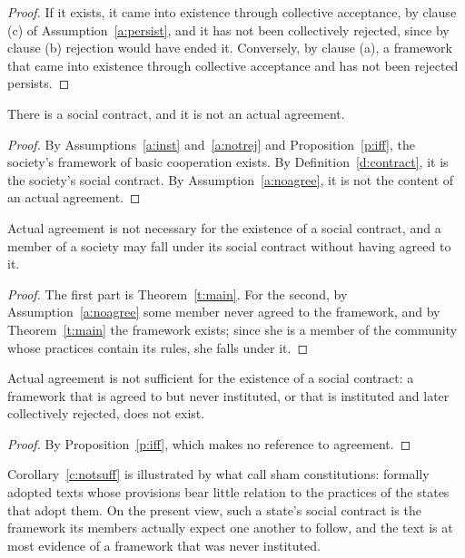 \documentclass{situationist-preprint}
\begin{document}
\begin{proof}
If it exists, it came into existence through collective acceptance, by clause (c) of Assumption~\ref{a:persist}, and it has not been collectively rejected, since by clause (b) rejection would have ended it. Conversely, by clause (a), a framework that came into existence through collective acceptance and has not been rejected persists.
\end{proof}

\begin{theorem}\label{t:main}
There is a social contract, and it is not an actual agreement.
\end{theorem}

\begin{proof}
By Assumptions~\ref{a:inst} and~\ref{a:notrej} and Proposition~\ref{p:iff}, the society's framework of basic cooperation exists. By Definition~\ref{d:contract}, it is the society's social contract. By Assumption~\ref{a:noagree}, it is not the content of an actual agreement.
\end{proof}

\begin{corollary}\label{c:notnec}
Actual agreement is not necessary for the existence of a social contract, and a member of a society may fall under its social contract without having agreed to it.
\end{corollary}

\begin{proof}
The first part is Theorem~\ref{t:main}. For the second, by Assumption~\ref{a:noagree} some member never agreed to the framework, and by Theorem~\ref{t:main} the framework exists; since she is a member of the community whose practices contain its rules, she falls under it.
\end{proof}

\begin{corollary}\label{c:notsuff}
Actual agreement is not sufficient for the existence of a social contract: a framework that is agreed to but never instituted, or that is instituted and later collectively rejected, does not exist.
\end{corollary}

\begin{proof}
By Proposition~\ref{p:iff}, which makes no reference to agreement.
\end{proof}

Corollary~\ref{c:notsuff} is illustrated by what \citet{LawVersteeg2013} call sham constitutions: formally adopted texts whose provisions bear little relation to the practices of the states that adopt them. On the present view, such a state's social contract is the framework its members actually expect one another to follow, and the text is at most evidence of a framework that was never instituted.
\end{document}
